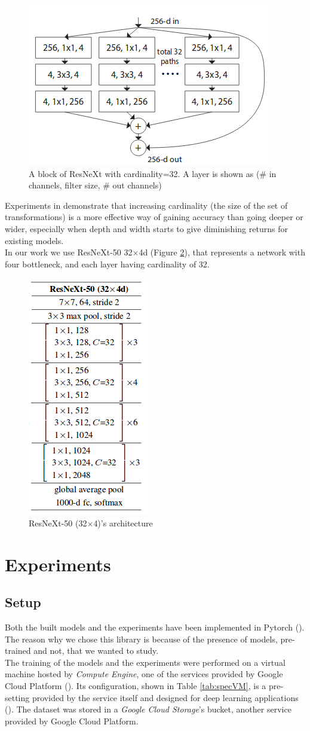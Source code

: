 \documentclass{article}
\begin{document}
\begin{figure}[h]
	\centering
	\includegraphics[width=0.5\linewidth]{image/resnext}
	\caption{A block of ResNeXt with cardinality=32. A layer is shown as (\# in channels, filter size, \# out channels)}
	\label{fig:resnext_block}
\end{figure}

Experiments in \cite{resneXt} demonstrate that increasing cardinality (the size of the set of transformations) is a more effective way of gaining accuracy than going deeper or wider, especially when depth and width starts to give diminishing returns for existing models.\\
In our work we use ResNeXt-50 32$\times$4d (Figure \ref{fig:res}), that represents a network with four bottleneck, and each layer having cardinality of 32. 

\begin{figure}
	\centering
	\includegraphics[height=0.4\linewidth]{image/res}
	\caption{ResNeXt-50 (32$\times$4)'s architecture}
	\label{fig:res}
\end{figure}
\newpage
\section{Experiments}\label{experiments}

\subsection{Setup}
Both the built models and the experiments have been implemented in Pytorch (\cite{pytorch}). The reason why we chose this library is because of the presence of models, pre-trained and not, that we wanted to study.\\
The training of the models and the experiments were performed on a virtual machine hosted by \textit{Compute Engine}, one of the services provided by Google Cloud Platform (\cite{gcloud}). Its configuration, shown in Table \ref{tab:specVM}, is a pre-setting provided by the service itself and designed for deep learning applications  (\cite{vmconfig}). The dataset was stored in a \textit{Google Cloud Storage}'s bucket, another service provided by Google Cloud Platform.
\end{document}
